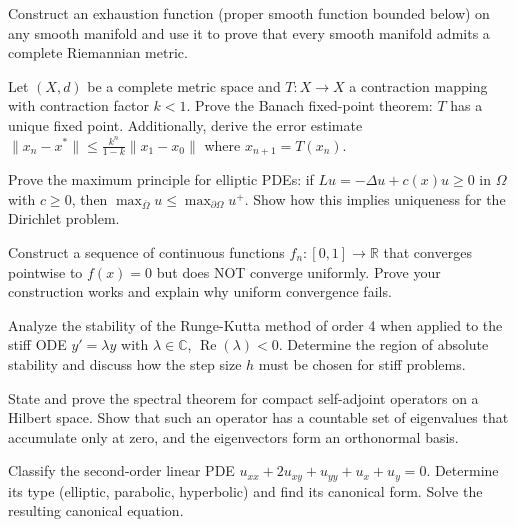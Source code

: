 \documentclass[12pt,a4paper]{exam}
\begin{document}
\begin{questions}
\question[4]
Construct an exhaustion function (proper smooth function bounded below) on any smooth manifold and use it to prove that every smooth manifold admits a complete Riemannian metric.

\vspace{0.3cm}

\question[2]
Let $(X, d)$ be a complete metric space and $T: X \to X$ a contraction mapping with contraction factor $k < 1$. Prove the Banach fixed-point theorem: $T$ has a unique fixed point. Additionally, derive the error estimate $\|x_n - x^*\| \leq \frac{k^n}{1-k} \|x_1 - x_0\|$ where $x_{n+1} = T(x_n)$.

\vspace{0.3cm}

\question[5]
Prove the maximum principle for elliptic PDEs: if $Lu = -\Delta u + c(x) u \geq 0$ in $\Omega$ with $c \geq 0$, then $\max_{\overline{\Omega}} u \leq \max_{\partial\Omega} u^+$. Show how this implies uniqueness for the Dirichlet problem.

\vspace{0.3cm}

\question[5]
Construct a sequence of continuous functions $f_n: [0,1] \to \mathbb{R}$ that converges pointwise to $f(x) = 0$ but does NOT converge uniformly. Prove your construction works and explain why uniform convergence fails.

\vspace{0.3cm}

\question[5]
Analyze the stability of the Runge-Kutta method of order 4 when applied to the stiff ODE $y' = \lambda y$ with $\lambda \in \mathbb{C}$, $\operatorname{Re}(\lambda) < 0$. Determine the region of absolute stability and discuss how the step size $h$ must be chosen for stiff problems.

\vspace{0.3cm}

\question[4]
State and prove the spectral theorem for compact self-adjoint operators on a Hilbert space. Show that such an operator has a countable set of eigenvalues that accumulate only at zero, and the eigenvectors form an orthonormal basis.

\vspace{0.3cm}

\question[3]
Classify the second-order linear PDE $u_{xx} + 2u_{xy} + u_{yy} + u_x + u_y = 0$. Determine its type (elliptic, parabolic, hyperbolic) and find its canonical form. Solve the resulting canonical equation.


\end{questions}
\end{document}
